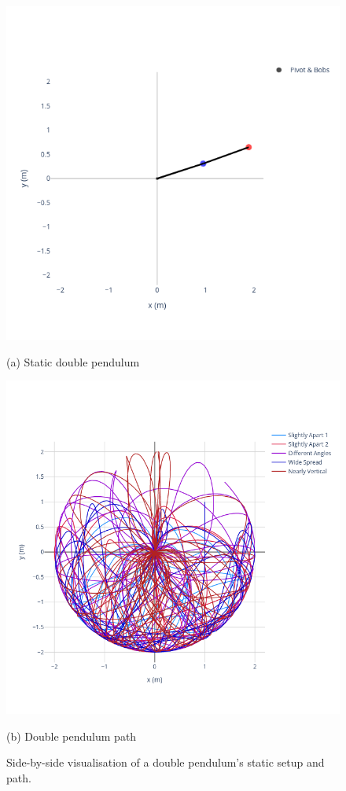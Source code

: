 \documentclass{article}
\begin{document}
\begin{figure}[H]
    \centering
    \begin{minipage}{0.45\textwidth}
        \centering
        \includegraphics[width=\linewidth]{double_pendulum_static}
        \caption*{(a) Static double pendulum}
    \end{minipage}%
    \hfill
    \begin{minipage}{0.45\textwidth}
        \centering
        \includegraphics[width=\linewidth]{double_pendulum_path}
        \caption*{(b) Double pendulum path}
    \end{minipage}
    \caption{Side-by-side visualisation of a double pendulum's static setup and path.}
    \label{fig:double_pendulum_side_by_side}
\end{figure}
\end{document}
